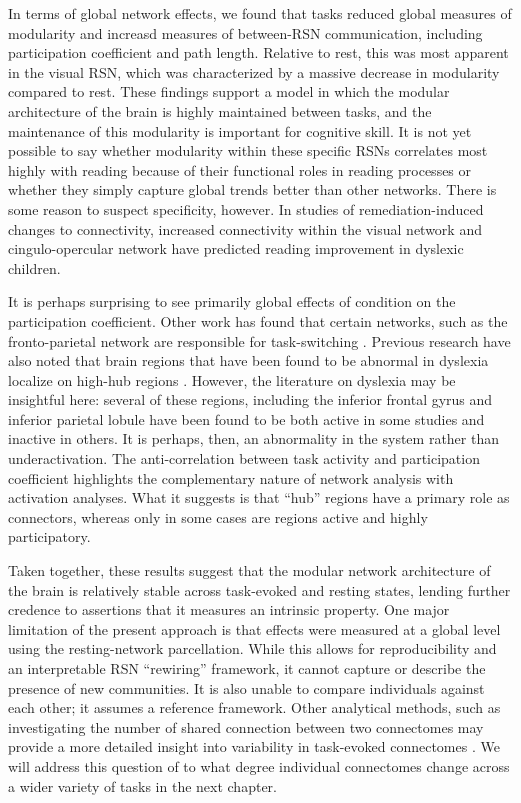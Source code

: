 In terms of global network effects, we found that tasks reduced global measures of modularity and increasd measures of between-RSN communication, including participation coefficient and path length. Relative to rest, this was most apparent in the visual RSN, which was characterized by a massive decrease in modularity compared to rest. These findings support a model in which the modular architecture of the brain is highly maintained between tasks, and the maintenance of this modularity is important for cognitive skill. It is not yet possible to say whether modularity within these specific RSNs correlates most highly with reading because of their functional roles in reading processes or whether they simply capture global trends better than other networks. There is some reason to suspect specificity, however. In studies of remediation-induced changes to connectivity, increased connectivity within the visual network \citep{Koyama2013} and cingulo-opercular network \citep{HorowitzKraus2015} have predicted reading improvement in dyslexic children. 

It is perhaps surprising to see primarily global effects of condition on the participation coefficient. Other work has found that certain networks, such as the fronto-parietal network are responsible for task-switching \citep{Cole2013}. Previous research have also noted that brain regions that have been found to be abnormal in dyslexia localize on high-hub regions \citep{Bailey2018}. However, the literature on dyslexia may be insightful here: several of these regions, including the inferior frontal gyrus and inferior parietal lobule have been found to be both active in some studies and inactive in others. It is perhaps, then, an abnormality in the system rather than underactivation. The anti-correlation between task activity and participation coefficient highlights the complementary nature of network analysis with activation analyses. What it suggests is that ``hub'' regions have a primary role as connectors, whereas only in some cases are regions active and highly participatory. 

Taken together, these results suggest that the modular network architecture of the brain is relatively stable across task-evoked and resting states, lending further credence to assertions that it measures an intrinsic property. One major limitation of the present approach is that effects were measured at a global level using the resting-network parcellation. While this allows for reproducibility and an interpretable RSN ``rewiring'' framework, it cannot capture or describe the presence of new communities. It is also unable to compare individuals against each other; it assumes a reference framework. Other analytical methods, such as investigating the number of shared connection between two connectomes may provide a more detailed insight into variability in task-evoked connectomes \citep{Petersen2016}. We will address this question of to what degree individual connectomes change across a wider variety of tasks in the next chapter.
